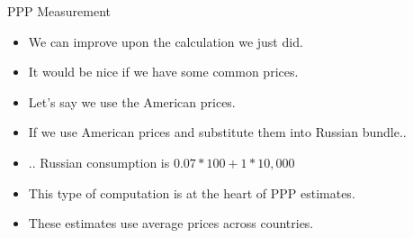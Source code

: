 \documentclass[shownotes,11pt, aspectratio=169]{beamer}
\begin{document}
\begin{frame}{PPP Measurement}
\begin{itemize}
\item We can improve upon the calculation we just did.
\item It would be nice if we have some common prices.
\item Let's say we use the American prices.
\item If we use American prices and substitute them into Russian bundle..\pause
\item .. Russian consumption is $0.07*100 + 1*10,000$
\item This type of computation is at the heart of PPP estimates.
\item These estimates use average prices across countries.
\end{itemize}
\end{frame}
\end{document}
